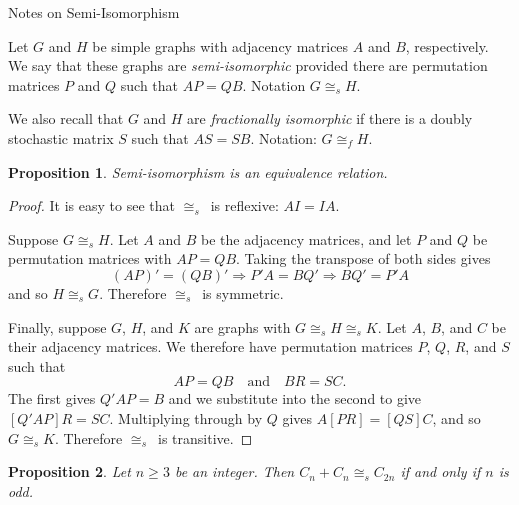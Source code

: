 \documentclass[12pt]{article}
\newcommand{\iso}{\cong}
\newcommand{\siso}{\ensuremath{\iso_s}}
\newcommand{\fiso}{\iso_f}
\newtheorem{prop}{Proposition}
\begin{document}
\begin{center}
    Notes on Semi-Isomorphism
\end{center}

Let $G$ and $H$ be simple graphs with adjacency matrices $A$ and $B$,
respectively. We say that these graphs are \emph{semi-isomorphic}
provided there are permutation matrices $P$ and $Q$ such that
$AP=QB$. Notation $G \siso H$.

We also recall that $G$ and $H$ are \emph{fractionally isomorphic} if
there is a doubly stochastic matrix $S$ such that $AS=SB$. Notation:
$G\fiso H$.

\begin{prop}
  Semi-isomorphism is an equivalence relation.
\end{prop}

\begin{proof}
  It is easy to see that \siso\ is reflexive: $AI=IA$.

  Suppose $G \siso H$. Let $A$ and $B$ be the adjacency matrices, and
  let $P$ and $Q$ be permutation matrices with $AP=QB$. Taking the
  transpose of both sides gives
  \[
  (AP)'=(QB)' \Rightarrow P'A=BQ' \Rightarrow BQ' = P'A
  \]
  and so $H\siso G$. Therefore \siso\ is symmetric.

  Finally, suppose $G$, $H$, and $K$ are graphs with $G\siso H\siso
  K$. Let $A$, $B$, and $C$ be their adjacency matrices. We therefore
  have permutation matrices $P$, $Q$, $R$, and $S$ such that
  \[
  AP=QB \quad\text{and}\quad BR = SC .
  \]
  The first gives $Q'AP = B$ and we substitute into the second to give
  $[Q'AP]R=SC$. Multiplying through by $Q$ gives $A[PR]= [QS]C$, and
  so $G\siso K$. Therefore \siso\ is transitive.
\end{proof}


\begin{prop}
  Let $n\ge3$ be an integer. Then $C_n+C_n \siso C_{2n}$ if and only
  if $n$ is odd.
\end{prop}
\end{document}
